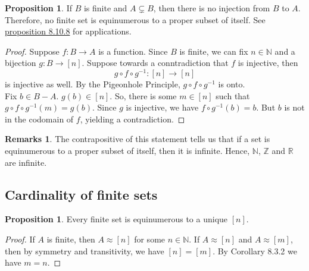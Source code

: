 \documentclass[14pt]{article}
\theoremstyle{definition}
\newtheorem*{remark}{Remarks}
\newtheorem{proposition}[definition]{Proposition}
\newcommand{\fun}[3]{#1\colon #2\rightarrow#3}
\newcommand{\bb}[1]{\mathbb{#1}}
\begin{document}
\vspace{2mm}

\hypertarget{proposition 8.3.3}{\begin{proposition}
    If $B$ is finite and $A\subsetneq B$, then there is no injection from $B$ to $A$. Therefore, no finite set 
    is equinumerous to a proper subset of itself. See 
    \hyperlink{proposition 8.10.8}{proposition 8.10.8} for applications.
\end{proposition}}
\begin{proof}
    Suppose $\fun{f}{B}{A}$ is a function. Since $B$ is finite, we can fix $n\in \bb{N}$ and a bijection 
    $\fun{g}{B}{[n]}$. Suppose towards a conntradiction that $f$ is injective, then
    \begin{equation*}
        g\circ f\circ g^{-1}\colon [n]\rightarrow [n]
    \end{equation*}
    is injective as well. By the Pigeonhole Principle, $ g\circ f\circ g^{-1}$ is onto.\\
    Fix $b\in B-A$. $g(b)\in[n]$. So, there is some $m\in [n]$ such that $g\circ f\circ g^{-1}(m)=g(b)$.
    Since $g$ is injective, we have $f\circ g^{-1}(b)=b$. But $b$ is not in the codomain of $f$, yielding a contradiction. 
\end{proof}

\begin{remark}
    The contrapositive of this statement tells us that if a set is equinumerous to 
    a proper subset of itself, then it is infinite. Hence, $\bb{N}$, $\bb{Z}$ and $\bb{R}$ are infinite.
\end{remark}

\vspace{5mm}

\subsection{Cardinality of finite sets}

\begin{proposition}
    Every finite set is equinumerous to a unique $[n]$.
\end{proposition}
\begin{proof}
   If $A$ is finite, then $A\approx [n]$ for some $n\in\bb{N}$. If $A\approx [n]$ and 
   $A\approx [m]$, then by symmetry and transitivity, we have $[n]=[m]$.
    By Corollary 8.3.2 we have $m=n$.
\end{proof}

\vspace{2mm}
\end{document}
